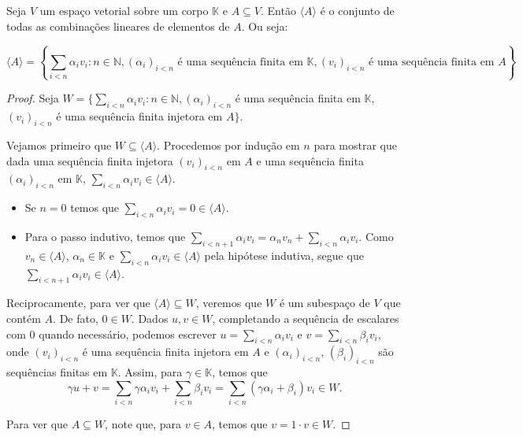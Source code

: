 \begin{proposition}
    Seja $V$ um espaço vetorial sobre um corpo $\mathbb K$ e $A \subseteq V$.
    Então $\langle A\rangle$ é o conjunto de todas as combinações lineares de elementos de $A$.
    Ou seja:

    \begin{equation*}
        \langle A \rangle = \left\{\sum_{i<n} \alpha_i v_i : n \in \mathbb N, (\alpha_i)_{i<n} \text{ é uma sequência finita em } \mathbb K, (v_i)_{i<n} \text{ é uma sequência finita em } A\right\}.
    \end{equation*}
\end{proposition}
\begin{proof}
    Seja $W=\{\sum_{i<n} \alpha_i v_i : n \in \mathbb N, (\alpha_i)_{i<n}$ é uma sequência finita em $\mathbb K$, $(v_i)_{i<n}$ é uma sequência finita injetora em $A\}.$

    Vejamos primeiro que $W\subseteq \langle A\rangle$.
    Procedemos por indução em $n$ para mostrar que dada uma sequência finita injetora $(v_i)_{i<n}$ em $A$ e uma sequência finita $(\alpha_i)_{i<n}$ em $\mathbb K$, $\sum_{i<n} \alpha_i v_i \in \langle A\rangle$.
    \begin{itemize} 
    \item Se $n=0$ temos que $\sum_{i<n} \alpha_i v_i = 0 \in \langle A\rangle$.
    \item Para o passo indutivo, temos que $\sum_{i<n+1} \alpha_i v_i = \alpha_n v_n + \sum_{i<n} \alpha_i v_i$.
    Como $v_n \in \langle A\rangle$, $\alpha_n \in \mathbb K$ e $\sum_{i<n} \alpha_i v_i \in \langle A\rangle$ pela hipótese indutiva, segue que $\sum_{i<n+1} \alpha_i v_i \in \langle A\rangle$.
    \end{itemize}

    Reciprocamente, para ver que $\langle A\rangle \subseteq W$, veremos que $W$ é um subespaço de $V$ que contém $A$.
    De fato, $0 \in W$.
    Dados $u, v \in W$, completando a sequência de escalares com $0$ quando necessário, podemos escrever $u = \sum_{i<n} \alpha_i v_i$ e $v = \sum_{i<n} \beta_i v_i$, onde $(v_i)_{i<n}$ é uma sequência finita injetora em $A$ e $(\alpha_i)_{i<n}$, $(\beta_i)_{i<n}$ são sequências finitas em $\mathbb K$.
    Assim, para $\gamma \in \mathbb K$, temos que
    \begin{equation*}
        \gamma u + v = \sum_{i<n} \gamma \alpha_i v_i + \sum_{i<n} \beta_i v_i = \sum_{i<n} (\gamma \alpha_i + \beta_i) v_i \in W.
    \end{equation*}

    Para ver que $A \subseteq W$, note que, para $v \in A$, temos que $v = 1 \cdot v \in W$.
\end{proof}